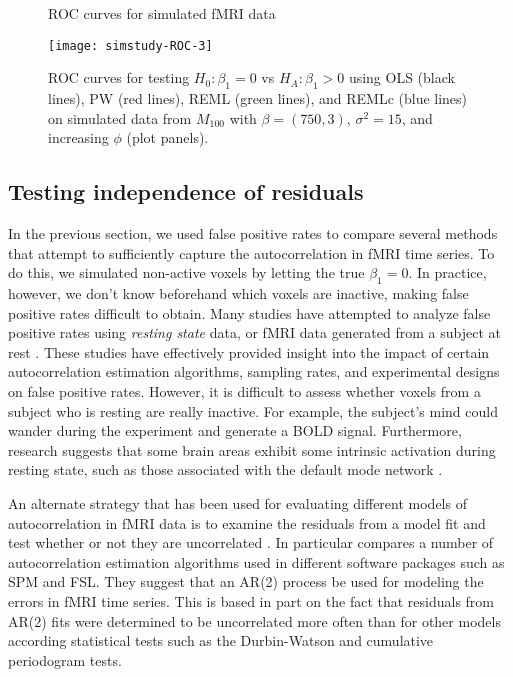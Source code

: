 \begin{figure}
\ssp
\centering
\caption{ROC curves for simulated fMRI data} \label{fig:fmri:roc}
\texttt{[image: simstudy-ROC-3]}
\caption*{ROC curves for testing $H_0: \beta_1 = 0$ vs $H_A: \beta_1 > 0$ using OLS (black lines), PW (red lines), REML (green lines), and REMLc (blue lines) on simulated data from $M_{100}$ with $\beta = (750, 3)$, $\sigma^2 = 15$, and increasing $\phi$ (plot panels).}
\end{figure}

\subsection{Testing independence of residuals \label{sec:fmri:res}}

In the previous section, we used false positive rates to compare several methods that attempt to sufficiently capture the autocorrelation in fMRI time series. To do this, we simulated non-active voxels by letting the true $\beta_1 = 0$. In practice, however, we don't know beforehand which voxels are inactive, making false positive rates difficult to obtain. Many studies have attempted to analyze false positive rates using \emph{resting state} data, or fMRI data generated from a subject at rest \citep{purdon:weiss:fpr:1998,burock:dale:fpr:2000,wool:rip:auto:2001}. These studies have effectively provided insight into the impact of certain autocorrelation estimation algorithms, sampling rates, and experimental designs on false positive rates. However, it is difficult to assess whether voxels from a subject who is resting are really inactive. For example, the subject's mind could wander during the experiment and generate a BOLD signal. Furthermore, research suggests that some brain areas exhibit some intrinsic activation during resting state, such as those associated with the default mode network \citep{grei:kras:dfmnet:2003,grei:sup:dfmnet:2009}.

An alternate strategy that has been used for evaluating different models of autocorrelation in fMRI data is to examine the residuals from a model fit and test whether or not they are uncorrelated \citep{luo:nich:diag:2003,leonski:bax:res:2008}. In particular \citet{leonski:bax:res:2008} compares a number of autocorrelation estimation algorithms used in different software packages such as SPM and FSL. They suggest that an AR(2) process be used for modeling the errors in fMRI time series. This is based in part on the fact that residuals from AR(2) fits were determined to be uncorrelated more often than for other models according statistical tests such as the Durbin-Watson and cumulative periodogram tests.

